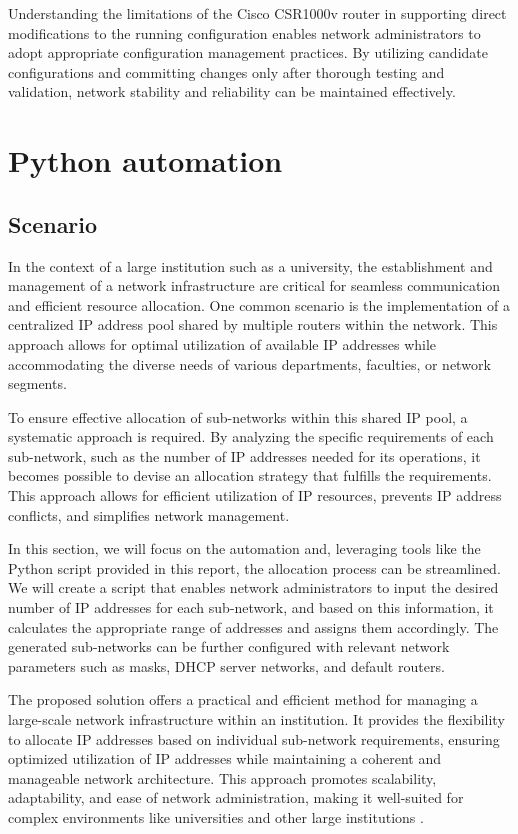 Understanding the limitations of the Cisco CSR1000v router in supporting direct modifications to the running configuration enables network administrators to adopt appropriate configuration management practices. By utilizing candidate configurations and committing changes only after thorough testing and validation, network stability and reliability can be maintained effectively.

\section{Python automation}
\subsection{Scenario}

In the context of a large institution such as a university, the establishment and management of a network infrastructure are critical for seamless communication and efficient resource allocation. One common scenario is the implementation of a centralized IP address pool shared by multiple routers within the network. This approach allows for optimal utilization of available IP addresses while accommodating the diverse needs of various departments, faculties, or network segments.

To ensure effective allocation of sub-networks within this shared IP pool, a systematic approach is required. By analyzing the specific requirements of each sub-network, such as the number of IP addresses needed for its operations, it becomes possible to devise an allocation strategy that fulfills the requirements. This approach allows for efficient utilization of IP resources, prevents IP address conflicts, and simplifies network management.

In this section, we will focus on the automation and, leveraging tools like the Python script provided in this report, the  allocation process can be streamlined. We will create a script that enables network administrators to input the desired number of IP addresses for each sub-network, and based on this information, it calculates the appropriate range of addresses and assigns them accordingly. The generated sub-networks can be further configured with relevant network parameters such as masks, DHCP server networks, and default routers.

The proposed solution offers a practical and efficient method for managing a large-scale network infrastructure within an institution. It provides the flexibility to allocate IP addresses based on individual sub-network requirements, ensuring optimized utilization of IP addresses while maintaining a coherent and manageable network architecture. This approach promotes scalability, adaptability, and ease of network administration, making it well-suited for complex environments like universities and other large institutions \cite{chat}.

